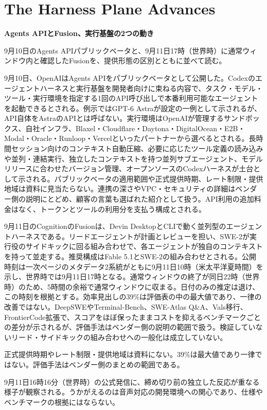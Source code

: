 \section{The Harness Plane Advances}
\begin{wideflow}
{\Large\bfseries Agents APIとFusion、実行基盤の2つの動き}\par
\smallskip
{\color{SurveyMuted}9月10日のAgents APIパブリックベータと、9月11日17時（世界時）に通常ウィンドウ内と確認したFusionを、提供形態の区別とともに並べて読む。}\par
\end{wideflow}

9月10日、OpenAIはAgents APIをパブリックベータとして公開した\cite{agentsapi}。Codexのエージェントハーネスと実行基盤を開発者向けに束ねる内容で、タスク・モデル・ツール・実行環境を指定する1回のAPI呼び出しで本番利用可能なエージェントを起動できるとされる。例示ではGPT-6 Astraが設定の一例として示されるが、API自体をAstraのAPIとは呼ばない。実行環境はOpenAIが管理するサンドボックス、自社インフラ、Blaxel・Cloudflare・Daytona・DigitalOcean・E2B・Modal・Oracle・Runloop・Vercelといったパートナーから選べるとされる。長時間セッション向けのコンテキスト自動圧縮、必要に応じたツール定義の読み込みや並列・連結実行、独立したコンテキストを持つ並列サブエージェント、モデルリリースに合わせたバージョン管理、オープンソースのCodexハーネスが土台として示される。パブリックベータの適用範囲や正式提供時期、レート制限・提供地域は資料に見当たらない。連携の深さやVPC・セキュリティの詳細はベンダー側の説明にとどめ、顧客の言葉も選ばれた紹介として扱う。API利用の追加料金はなく、トークンとツールの利用分を支払う構成とされる。

9月11日のCognitionのFusionは、Devin DesktopとCLIで動く並列型のエージェントハーネスである\cite{fusion}。リードエージェントが計画とレビューを担い、SWE-2が実行役のサイドキックに回る組み合わせで、各エージェントが独自のコンテキストを持って並走する。推奨構成はFable 5.1とSWE-2の組み合わせとされる。公開時刻は一次ページのメタデータ2系統がともに9月11日10時（米太平洋夏時間）を示し、世界時では9月11日17時となる。通常ウィンドウの終了が同日22時（世界時）のため、5時間の余裕で通常ウィンドウに収まる。日付のみの推定は退け、この時刻を根拠とする。効率見出しの39\%は評価表の中の最大値であり、一律の改善ではない。DeepSWEやTerminal-Bench、SWE-Atlas Q\&A、Vals移行、FrontierCode拡張で、スコアをほぼ保ったままコストを抑えるベンチマークごとの差分が示されるが、評価手法はベンダー側の説明の範囲で扱う。検証していないリード・サイドキックの組み合わせへの一般化は成立していない。

\begin{claimboundary}[提供形態と効率の境界]
正式提供時期やレート制限・提供地域は資料にない。39\%は最大値であり一律ではない。評価手法はベンダー側のまとめの範囲である。
\end{claimboundary}

\begin{communitynote}
9月11日16時16分（世界時）の公式発信に、締め切り前の独立した反応が重なる様子が観察される\cite{w37x-coding-official,w37x-coding-ind}。うかがえるのは音声対応の開発環境への関心であり、仕様やベンチマークの根拠にはならない。
\end{communitynote}
